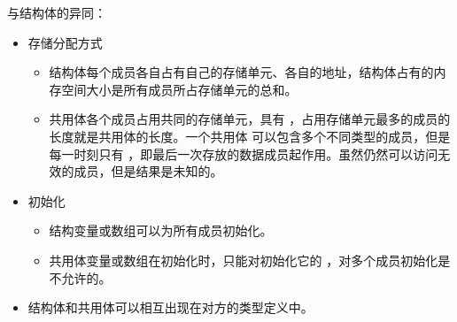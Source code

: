 \documentclass[letterpaper,10pt,english]{sphinxmanual}
\begin{document}
与结构体的异同：
\begin{itemize}
\item {} 
存储分配方式
\begin{itemize}
\item {} 
结构体每个成员各自占有自己的存储单元、各自的地址，结构体占有的内存空间大小是所有成员所占存储单元的总和。

\item {} 
共用体各个成员占用共同的存储单元，具有  ，占用存储单元最多的成员的长度就是共用体的长度。一个共用体
可以包含多个不同类型的成员，但是每一时刻只有  ，即最后一次存放的数据成员起作用。虽然仍然可以访问无效的成员，但是结果是未知的。
\begin{quote}

%
\begin{sphinxVerbatim}[commandchars=\\\{\}]
  
  
  
\end{sphinxVerbatim}
\end{quote}

\end{itemize}

\item {} 
初始化
\begin{itemize}
\item {} 
结构变量或数组可以为所有成员初始化。

\item {} 
共用体变量或数组在初始化时，只能对初始化它的  ，对多个成员初始化是不允许的。
\begin{quote}

%
\begin{sphinxVerbatim}[commandchars=\\\{\}]
     \PYG{p}{[}\PYG{p}{]}     
\end{sphinxVerbatim}
\end{quote}

\end{itemize}

\item {} 
结构体和共用体可以相互出现在对方的类型定义中。

\end{itemize}
\end{document}
